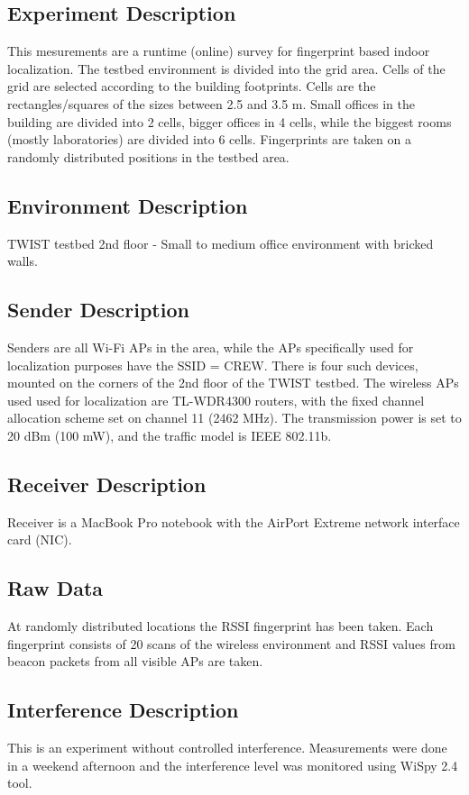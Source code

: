 \documentclass[11pt,a4paper,headinclude,footinclude,chapterprefix=on]{scrreprt}
\begin{document}
\subsection{Experiment Description}
This mesurements are a runtime (online) survey for fingerprint based indoor localization. The testbed environment is divided into the grid area. Cells of the grid are selected according to the building footprints. Cells are the rectangles/squares of the sizes between 2.5 and 3.5 m. Small offices in the building are divided into 2 cells, bigger offices in 4 cells, while the biggest rooms (mostly laboratories) are divided into 6 cells. Fingerprints are taken on a randomly distributed positions in the testbed area.

\subsection{Environment Description}
TWIST testbed 2nd floor - Small to medium office environment with bricked walls.

\subsection{Sender Description}
Senders are all Wi-Fi APs in the area, while the APs specifically used for localization purposes have the SSID = CREW. There is four such devices, mounted on the corners of the 2nd floor of the TWIST testbed. The wireless APs used used for localization are TL-WDR4300 routers, with the fixed channel allocation scheme set on channel 11 (2462 MHz). The transmission power is set to 20 dBm (100 mW), and the traffic model is IEEE 802.11b.

\subsection{Receiver Description}
Receiver is a MacBook Pro notebook with the AirPort Extreme network interface card (NIC).

\subsection{Raw Data}
At randomly distributed locations the RSSI fingerprint has been taken. Each fingerprint consists of 20 scans of the wireless environment and RSSI values from beacon packets from all visible APs are taken.

\subsection{Interference Description}
This is an experiment without controlled interference. Measurements were done in a weekend afternoon and the interference level was monitored using WiSpy 2.4 tool.
\end{document}
